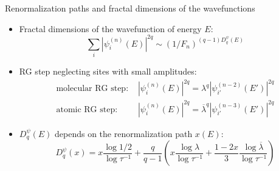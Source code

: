 \documentclass[xcolor=x11names,compress,professionalfonts]{beamer}
\renewcommand{\(}{\begin{columns}}
\renewcommand{\)}{\end{columns}}
\newcommand{\<}[1]{\begin{column}{#1}}
\renewcommand{\>}{\end{column}}
\newcommand{\lb}{\ensuremath{\overline{\lambda}}}
\begin{document}
\begin{frame}{Renormalization paths and fractal dimensions of the wavefunctions}
\begin{itemize}
	\item Fractal dimensions of the wavefunction of energy $E$:
	\[ \sum_i |\psi_i^{(n)}(E)|^{2q} \sim (1/F_n)^{(q-1)D_q^\psi(E)}  \]
	\item RG step neglecting sites with small amplitudes:
		\begin{align*}
			\text{molecular RG step:~} &|\psi_i^{(n)}(E)|^{2q} = \lambda^q |\psi_{i'}^{(n-2)}(E')|^{2q} \\
			\text{atomic RG step:~} &|\psi_i^{(n)}(E)|^{2q} = \lb^q |\psi_{i'}^{(n-3)}(E')|^{2q}
		\end{align*}
	\item $D_q^\psi(E)$ depends on the renormalization path $x(E)$:
	\[ D_q^\psi(x) = x \frac{\log 1/2}{\log \tau^{-1}} + \frac{q}{q-1} \left( x \frac{\log \lambda}{\log \tau^{-1}} + \frac{1-2x}{3}\frac{\log \lb}{\log \tau^{-1}} \right) \]
\end{itemize}
\end{frame}
\end{document}
